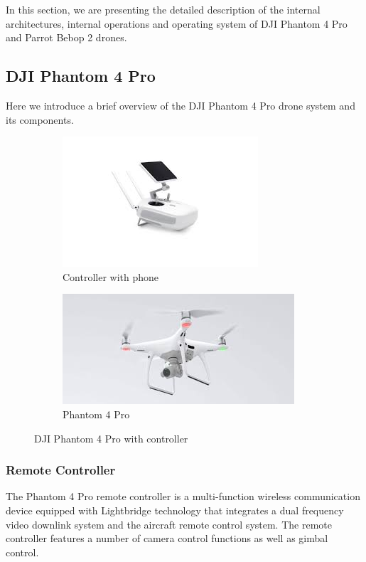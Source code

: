 \documentclass[conference]{IEEEtran}
\begin{document}
In this section, we are presenting the detailed description of the internal architectures, internal operations and operating system of DJI Phantom 4 Pro and  Parrot Bebop 2 drones. 


\subsection{DJI Phantom 4 Pro}
Here we introduce a brief overview of the DJI Phantom 4 Pro drone system and its components. 
\begin{figure}[h!]
	\centering
	\begin{subfigure}{.23\textwidth}
		\centering
		\includegraphics[width=0.9\linewidth]{rc}
		\caption{Controller with phone}
	\end{subfigure}
	\begin{subfigure}{.23\textwidth}
		\centering
		\includegraphics[height=0.11\textheight, width=0.9\linewidth]{drone}
		\caption{Phantom 4 Pro}
	\end{subfigure}
	\caption{DJI Phantom 4 Pro with controller}
\end{figure}



\subsubsection{Remote Controller} The Phantom 4 Pro remote controller is a multi-function wireless communication device equipped with Lightbridge technology that integrates a dual frequency video downlink system and the aircraft remote control system. The remote controller features a number of camera control functions as well as gimbal control. 
\end{document}
